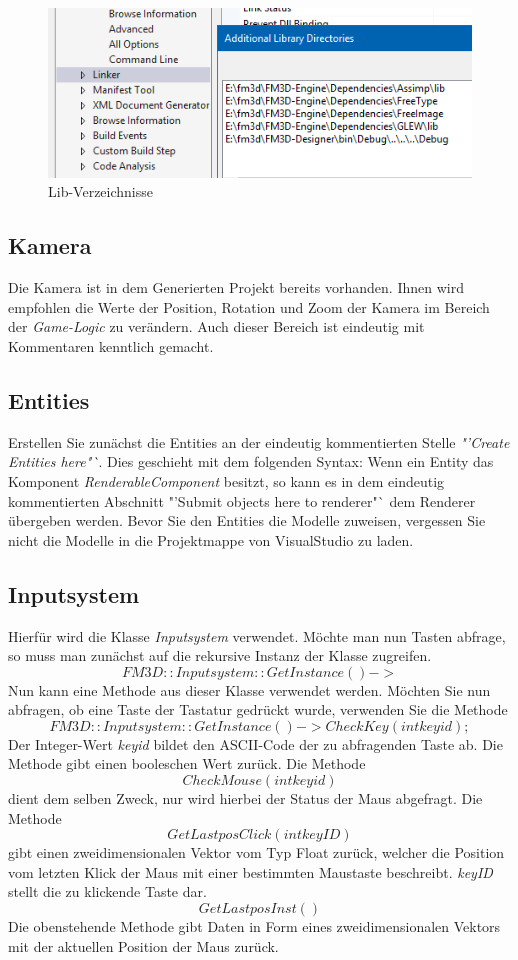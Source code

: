\begin{figure}
	\begin{center}
		\includegraphics[width=\textwidth]{04verwendung/Engine/lib.png}
		\caption{Lib-Verzeichnisse}\label{liblib}
	\end{center}
\end{figure}

\subsection{Kamera}
Die Kamera ist in dem Generierten Projekt bereits vorhanden. Ihnen wird empfohlen die Werte der Position, Rotation und Zoom der Kamera im Bereich der \textit{Game-Logic} zu verändern. Auch dieser Bereich ist eindeutig mit Kommentaren kenntlich gemacht.

\subsection{Entities}
Erstellen Sie zunächst die Entities an der eindeutig kommentierten Stelle \textit{"'Create Entities here"`}. Dies geschieht mit dem folgenden Syntax:
Wenn ein Entity das Komponent \textit{RenderableComponent} besitzt, so kann es in dem eindeutig kommentierten Abschnitt "'Submit objects here to renderer"` dem Renderer übergeben werden.
Bevor Sie den Entities die Modelle zuweisen, vergessen Sie nicht die Modelle in die Projektmappe von VisualStudio zu laden.

\subsection{Inputsystem}
\label{inputsystemver}
Hierfür wird die Klasse \textit{Inputsystem} verwendet. Möchte man nun Tasten abfrage, so muss man zunächst auf die rekursive Instanz der Klasse zugreifen. 
$$FM3D::Inputsystem::GetInstance()->$$
Nun kann eine Methode aus dieser Klasse verwendet werden.
Möchten Sie nun abfragen, ob eine Taste der Tastatur gedrückt wurde, verwenden Sie die Methode
$$FM3D::Inputsystem::GetInstance()->CheckKey(int  keyid);$$
Der Integer-Wert \textit{keyid} bildet den ASCII-Code der zu abfragenden Taste ab. Die Methode gibt einen booleschen Wert zurück. Die Methode $$CheckMouse(int  keyid)$$ dient dem selben Zweck, nur wird hierbei der Status der Maus abgefragt.
Die Methode $$GetLastposClick(int keyID)$$
gibt einen zweidimensionalen Vektor vom Typ Float zurück, welcher die Position vom letzten Klick der Maus mit einer bestimmten Maustaste beschreibt. \textit{keyID} stellt die zu klickende Taste dar. 
$$GetLastposInst()$$
Die obenstehende Methode gibt Daten in Form eines zweidimensionalen Vektors mit der aktuellen Position der Maus zurück.

